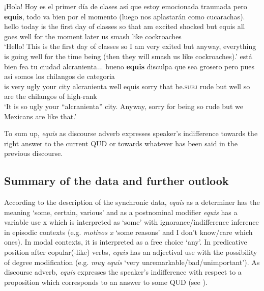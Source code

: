 \documentclass[output=paper]{langsci/langscibook}
\begin{document}
\ea\label{ex:kellert:34}
\gll ¡Hola! Hoy es el primer día de clases así que estoy emocionada traumada pero \textbf{equis}, todo va bien por el momento (luego nos aplastarán como cucarachas).\\
hello today is the first day of classes so that am excited shocked but equis all goes well for the moment later us smash like cockroaches\\
\glt ‘Hello! This is the first day of classes so I am very exited but anyway, everything is going well for the time being (then they will smash us like cockroaches).’
\ex 
\gll está bien fea tu ciudad alcranienta... bueno \textbf{equis} disculpa que sea grosero pero pues asi somos los chilangos de categoria\\
is very ugly your city alcranienta well equis sorry that be.\textsc{subj} rude but well so are the chilangos of high-rank\\
\glt ‘It is so ugly your “alcranienta” city. Anyway, sorry for being so rude but we Mexicans are like that.’
\z

To sum up, \textit{equis} as discourse adverb expresses speaker’s indifference towards the right answer to the current QUD or towards whatever has been said in the previous discourse.

\subsection{Summary of the data and further outlook}\label{sec:kellert:2.5}\largerpage[-1]
According to the description of the synchronic data, \textit{equis} as a determiner has the meaning ‘some, certain, various’ and as a postnominal modifier \textit{equis} has a variable use x which is interpreted as ‘some’ with ignorance/indifference inference in episodic contexts (e.g. \textit{motivos x} ‘some reasons’ and I don’t know/care which ones). In modal contexts, it is interpreted as a free choice ‘any’. In predicative position after copular(-like) verbs, \textit{equis} has an adjectival use with the possibility of degree modification (e.g. \textit{muy equis} ‘very unremarkable\slash bad\slash unimportant’). As discourse adverb, \textit{equis} expresses the speaker’s indifference with respect to a proposition which corresponds to an answer to some QUD (see ).
\end{document}
